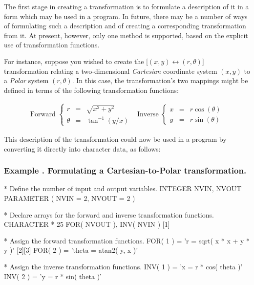 \documentclass[twoside,nolof,11pt]{starlink}
\newcounter{examplecounter}
\providecommand{\example}[1]{\addtocounter{examplecounter}{1}
                         \subsubsection*{Example \theexamplecounter. #1}}
\begin{document}
The first stage in creating a transformation is to formulate a description
of it in a form which may be used in a program.
In future, there may be a number of ways of formulating such a description
and of creating a corresponding transformation from it.
At present, however, only one method is supported, based on the explicit use
of transformation functions.

For instance, suppose you wished to create the \mbox{[$(x,y) \leftrightarrow
(r,\theta)$]} transformation relating a two-dimensional \emph{Cartesian}
coordinate system \mbox{$(x,y)$} to a \emph{Polar} system
\mbox{$(r,\theta)$}.
In this case, the transformation's two mappings might be defined in terms of
the following transformation functions:

\begin{equation}
\begin{array}{cc}
\mbox{Forward } \left\{
\begin{array}{lll}
r & = & \sqrt{x^2+y^2} \\
\theta & = & \tan^{-1} \left( {y/x} \right)
\end{array}
\right.
&
\mbox{Inverse } \left\{
\begin{array}{lll}
x & = & r \cos( \theta ) \\
y & = & r \sin( \theta )
\end{array}
\right.
\end{array}
\label{equation:polar}
\end{equation}

This description of the transformation could now be used in a program by
converting it directly into character data, as follows:

\example{Formulating a Cartesian-to-Polar transformation.}
\begin{terminalv}
*  Define the number of input and output variables.
      INTEGER NVIN, NVOUT
      PARAMETER ( NVIN = 2, NVOUT = 2 )

*  Declare arrays for the forward and inverse transformation functions.
      CHARACTER * 25  FOR( NVOUT ), INV( NVIN )        [1]

*  Assign the forward transformation functions.
      FOR( 1 ) = 'r = sqrt( x * x + y * y )'           [2][3]
      FOR( 2 ) = 'theta = atan2( y, x )'

*  Assign the inverse transformation functions.
      INV( 1 ) = 'x = r * cos( theta )'
      INV( 2 ) = 'y = r * sin( theta )'

\end{terminalv}
\end{document}
